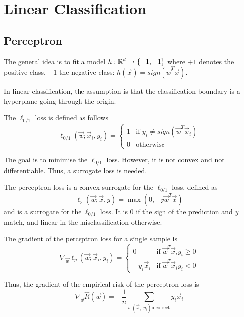\chapter{Linear Classification}

\section{Perceptron}
The general idea is to fit a model
$h: \mathbb{R}^d \to \{+1, -1\}$ where $+1$ denotes the positive
class, $-1$ the negative class:
$h(\vec{x}) = sign(\vec{w}^T \vec{x})$.

In linear classification, the assumption is that
the classification boundary is a hyperplane
going through the origin.

The $\ell_{0/1}$ loss is defined as follows
\begin{equation*}
\ell_{0/1}(\vec{w}; \vec{x}_i, y_i) =
\begin{cases}
1 & \text{if $y_i \neq sign(\vec{w}^T \vec{x}_i)$} \\
0 & \text{otherwise}
\end{cases}
\end{equation*}

The goal is to minimise the $\ell_{0/1}$ loss.
However, it is not convex and not differentiable.
Thus, a surrogate loss is needed.

The perceptron loss is a convex surrogate for the
$\ell_{0/1}$ loss, defined as
\begin{equation*}
\ell_p(\vec{w}; \vec{x}, y) =
\max(0, -y \vec{w}^T \vec{x})
\end{equation*}
and is a surrogate for the $\ell_{0/1}$ loss.
It is $0$ if the sign of the prediction and $y$ match,
and linear in the misclassification otherwise.

The gradient of the perceptron loss for a single sample is
\begin{equation*}
\nabla_{\vec{w}} \ell_p(\vec{w}; \vec{x}_i, y_i) =
\begin{cases}
0 & \text{if $\vec{w}^T \vec{x}_i y_i \geq 0$} \\
-y_i \vec{x}_i & \text{if $\vec{w}^T \vec{x}_i y_i < 0$}
\end{cases}
\end{equation*}

Thus, the gradient of the empirical risk of the perceptron loss is
\begin{equation*}
\nabla_{\vec{w}} \hat{R}(\vec{w})
= - \frac{1}{n} \sum_{i : (\vec{x}_i, y_i) \text{incorrect}}{
	y_i \vec{x}_i
}
\end{equation*}

